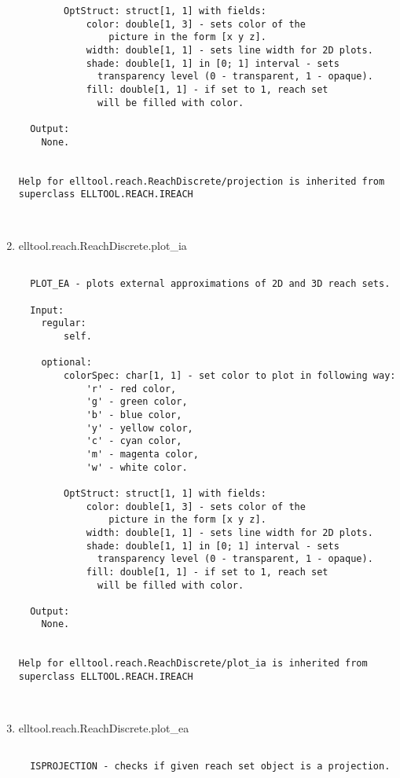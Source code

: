 \begin{enumerate}
\begin{lstlisting}
        OptStruct: struct[1, 1] with fields:
            color: double[1, 3] - sets color of the
                picture in the form [x y z].
            width: double[1, 1] - sets line width for 2D plots.
            shade: double[1, 1] in [0; 1] interval - sets
              transparency level (0 - transparent, 1 - opaque).
            fill: double[1, 1] - if set to 1, reach set
              will be filled with color.

  Output:
    None.


Help for elltool.reach.ReachDiscrete/projection is inherited from superclass ELLTOOL.REACH.IREACH



\end{lstlisting}
\fontfamily{\familydefault}
\selectfont
\item {elltool.reach.ReachDiscrete.plot\_ia}
\selectfont
\begin{lstlisting}

  PLOT_EA - plots external approximations of 2D and 3D reach sets.

  Input:
    regular:
        self.

    optional:
        colorSpec: char[1, 1] - set color to plot in following way:
            'r' - red color,
            'g' - green color,
            'b' - blue color,
            'y' - yellow color,
            'c' - cyan color,
            'm' - magenta color,
            'w' - white color.

        OptStruct: struct[1, 1] with fields:
            color: double[1, 3] - sets color of the
                picture in the form [x y z].
            width: double[1, 1] - sets line width for 2D plots.
            shade: double[1, 1] in [0; 1] interval - sets
              transparency level (0 - transparent, 1 - opaque).
            fill: double[1, 1] - if set to 1, reach set
              will be filled with color.

  Output:
    None.


Help for elltool.reach.ReachDiscrete/plot_ia is inherited from superclass ELLTOOL.REACH.IREACH



\end{lstlisting}
\fontfamily{\familydefault}
\selectfont
\item {elltool.reach.ReachDiscrete.plot\_ea}
\selectfont
\begin{lstlisting}

  ISPROJECTION - checks if given reach set object is a projection.


\end{lstlisting}
\end{enumerate}
